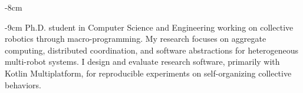 \documentclass[10pt,a4paper]{altacv}
\begin{document}

    \begin{adjustwidth}{}{-8cm}
        \makecvheader
    \end{adjustwidth}

\begin{adjustwidth}{}{-9cm}
    Ph.D. student in Computer Science and Engineering working on collective robotics through
    macro-programming. My research focuses on aggregate computing, distributed coordination,
    and software abstractions for heterogeneous multi-robot systems. I design and evaluate
    research software, primarily with Kotlin Multiplatform, for reproducible experiments on
    self-organizing collective behaviors.
\end{adjustwidth}
\end{document}
